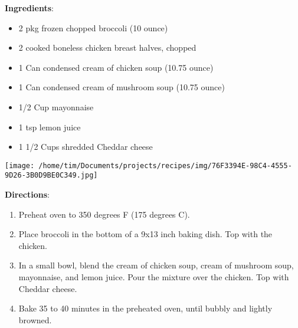 \documentclass[11pt, twoside, openany]{book}
\begin{document}
\begin{minipage}[t]{0.8\linewidth}
\textbf{Ingredients}:\vspace{-3mm}
\begin{multicols}{2}
\begin{itemize}\setlength\itemsep{-1mm}
\item 2 pkg frozen chopped broccoli (10 ounce)
\item 2 cooked boneless chicken breast halves, chopped
\item 1 Can condensed cream of chicken soup (10.75 ounce)
\item 1 Can condensed cream of mushroom soup (10.75 ounce)
\item 1/2 Cup mayonnaise
\item 1 tsp lemon juice
\item 1 1/2 Cups shredded Cheddar cheese
\end{itemize}
\end{multicols}
\end{minipage}
\begin{minipage}[t]{0.2\linewidth}
\centering \strut\vspace*{-\baselineskip}\newline
\texttt{[image: /home/tim/Documents/projects/recipes/img/76F3394E-98C4-4555-9D26-3B0D9BE0C349.jpg]}\\
\end{minipage}\vspace{3mm}
\textbf{Directions}:
\vspace{-3mm}\begin{enumerate}\setlength\itemsep{-1mm}
\item Preheat oven to 350 degrees F (175 degrees C).
\item Place broccoli in the bottom of a 9x13 inch baking dish. Top with the chicken.
\item In a small bowl, blend the cream of chicken soup, cream of mushroom soup, mayonnaise, and lemon juice. Pour the mixture over the chicken. Top with Cheddar cheese.
\item Bake 35 to 40 minutes in the preheated oven, until bubbly and lightly browned.
\end{enumerate}
 \label{country-vegetable-soup}\hfill\textit{}\\
\end{document}
